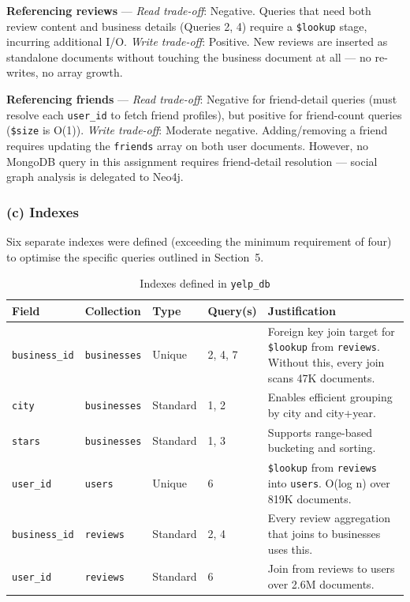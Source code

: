\documentclass[12pt,a4paper]{article}
\newcommand{\code}[1]{\texttt{#1}}
\begin{document}
\textbf{Referencing reviews} --- \textit{Read trade-off}: Negative. Queries
that need both review content and business details (Queries 2, 4) require a
\code{\$lookup} stage, incurring additional I/O. \textit{Write trade-off}:
Positive. New reviews are inserted as standalone documents without touching
the business document at all --- no re-writes, no array growth.

\textbf{Referencing friends} --- \textit{Read trade-off}: Negative for
friend-detail queries (must resolve each \code{user\_id} to fetch friend
profiles), but positive for friend-count queries (\code{\$size} is O(1)).
\textit{Write trade-off}: Moderate negative. Adding/removing a friend requires
updating the \code{friends} array on both user documents. However, no MongoDB
query in this assignment requires friend-detail resolution --- social graph
analysis is delegated to Neo4j.

\subsubsection{(c) Indexes}

Six separate indexes were defined (exceeding the minimum requirement of four)
to optimise the specific queries outlined in Section~5.

\begin{table}[H]
  \centering
  \begin{tabularx}{\textwidth}{llll>{\raggedright\arraybackslash}X}
    \toprule
    \textbf{Field} & \textbf{Collection} & \textbf{Type} & \textbf{Query(s)} & \textbf{Justification} \\
    \midrule
    \code{business\_id} & \code{businesses} & Unique & 2, 4, 7 & Foreign key join target for \code{\$lookup} from \code{reviews}. Without this, every join scans 47K documents. \\[4pt]
    \code{city}         & \code{businesses} & Standard & 1, 2 & Enables efficient grouping by city and city+year. \\[4pt]
    \code{stars}        & \code{businesses} & Standard & 1, 3 & Supports range-based bucketing and sorting. \\[4pt]
    \code{user\_id}     & \code{users}      & Unique & 6 & \code{\$lookup} from \code{reviews} into \code{users}. O(log n) over 819K documents. \\[4pt]
    \code{business\_id} & \code{reviews}    & Standard & 2, 4 & Every review aggregation that joins to businesses uses this. \\[4pt]
    \code{user\_id}     & \code{reviews}    & Standard & 6 & Join from reviews to users over 2.6M documents. \\
    \bottomrule
  \end{tabularx}
  \caption{Indexes defined in \code{yelp\_db}}
\end{table}
\end{document}

